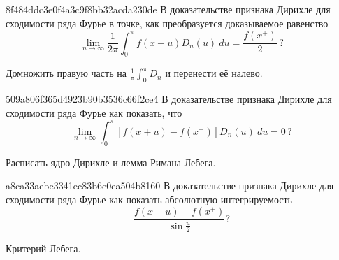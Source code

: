 \begin{note}{8f484ddc3e0f4a3c9f8bb32acda230de}
    В доказательстве признака Дирихле для сходимости ряда Фурье в точке, как преобразуется доказываемое равенство
    \[
        \lim_{n \to \infty} \frac{1}{2\pi} \int_{0}^{\pi} f(x+u) D_n(u)\: du = \frac{f(x^{+})}{2}\,?
    \]

    \begin{cloze}{1}
        Домножить правую часть на \({ \frac{1}{\pi} \int_{0}^{\pi} D_n }\) и перенести её налево.
    \end{cloze}
\end{note}

\begin{note}{509a806f365d4923b90b3536c66f2ce4}
    В доказательстве признака Дирихле для сходимости ряда Фурье как показать, что
    \[
        \lim_{n \to \infty} \int_{0}^{\pi} [f(x+u) - f(x^{+})] D_n(u)\: du = 0\,?
    \]

    \begin{cloze}{1}
        Расписать ядро Дирихле и лемма Римана-Лебега.
    \end{cloze}
\end{note}

\begin{note}{a8ca33aebe3341ec83b6e0ea504b8160}
    В доказательстве признака Дирихле для сходимости ряда Фурье как показать абсолютную интегрируемость
    \[
        \frac{f(x + u) - f(x^{+})}{\sin \frac{u}{2}}?
    \]

    \begin{cloze}{1}
        Критерий Лебега.
    \end{cloze}
\end{note}


